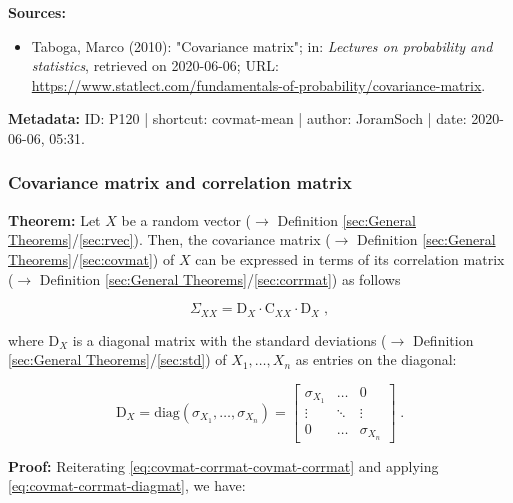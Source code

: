 \documentclass[a4paper,12pt,twoside]{book}
\begin{document}
\vspace{1em}
\textbf{Sources:}
\begin{itemize}
\item Taboga, Marco (2010): "Covariance matrix"; in: \textit{Lectures on probability and statistics}, retrieved on 2020-06-06; URL: \url{https://www.statlect.com/fundamentals-of-probability/covariance-matrix}.
\end{itemize}


\vspace{1em}
\textbf{Metadata:} ID: P120 | shortcut: covmat-mean | author: JoramSoch | date: 2020-06-06, 05:31.
\vspace{1em}



\subsubsection[\textbf{Covariance matrix and correlation matrix}]{Covariance matrix and correlation matrix} \label{sec:covmat-corrmat}
\setcounter{equation}{0}

\textbf{Theorem:} Let $X$ be a random vector ($\rightarrow$ Definition \ref{sec:General Theorems}/\ref{sec:rvec}). Then, the covariance matrix ($\rightarrow$ Definition \ref{sec:General Theorems}/\ref{sec:covmat}) of $X$ can be expressed in terms of its correlation matrix ($\rightarrow$ Definition \ref{sec:General Theorems}/\ref{sec:corrmat}) as follows

\begin{equation} \label{eq:covmat-corrmat-covmat-corrmat}
\Sigma_{XX} = \mathrm{D}_X \cdot \mathrm{C}_{XX} \cdot \mathrm{D}_X \; ,
\end{equation}

where $\mathrm{D}_X$ is a diagonal matrix with the standard deviations ($\rightarrow$ Definition \ref{sec:General Theorems}/\ref{sec:std}) of $X_1, \ldots, X_n$ as entries on the diagonal:

\begin{equation} \label{eq:covmat-corrmat-diagmat}
\mathrm{D}_X = \mathrm{diag}(\sigma_{X_1},\ldots,\sigma_{X_n}) =
\begin{bmatrix}
\sigma_{X_1} & \ldots & 0 \\
\vdots & \ddots & \vdots \\
0 & \ldots & \sigma_{X_n}
\end{bmatrix} \; .
\end{equation}


\vspace{1em}
\textbf{Proof:} Reiterating \eqref{eq:covmat-corrmat-covmat-corrmat} and applying \eqref{eq:covmat-corrmat-diagmat}, we have:
\end{document}
